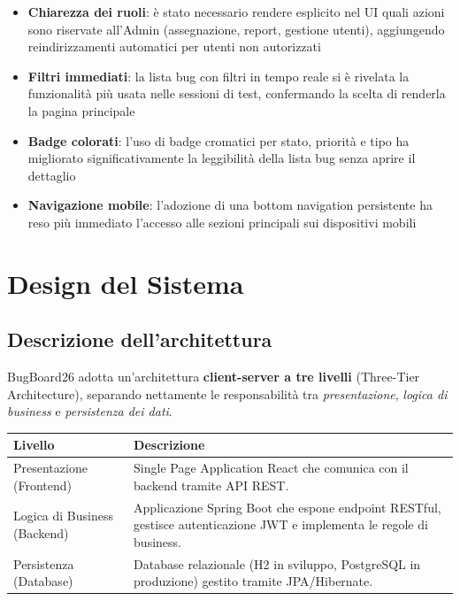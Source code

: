 ﻿\documentclass[a4paper,11pt]{article}
\begin{document}
\begin{itemize}
  \item \textbf{Chiarezza dei ruoli}: \`e stato necessario rendere esplicito nel UI quali azioni sono riservate all'Admin (assegnazione, report, gestione utenti), aggiungendo reindirizzamenti automatici per utenti non autorizzati
  \item \textbf{Filtri immediati}: la lista bug con filtri in tempo reale si \`e rivelata la funzionalit\`a pi\`u usata nelle sessioni di test, confermando la scelta di renderla la pagina principale
  \item \textbf{Badge colorati}: l'uso di badge cromatici per stato, priorit\`a e tipo ha migliorato significativamente la leggibilit\`a della lista bug senza aprire il dettaglio
  \item \textbf{Navigazione mobile}: l'adozione di una bottom navigation persistente ha reso pi\`u immediato l'accesso alle sezioni principali sui dispositivi mobili
\end{itemize}

\section{Design del Sistema}

\subsection{Descrizione dell'architettura}

BugBoard26 adotta un'architettura \textbf{client-server a tre livelli} (Three-Tier Architecture), separando nettamente le responsabilit\`a tra \emph{presentazione}, \emph{logica di business} e \emph{persistenza dei dati}.

\begin{tabular}{|l|p{10cm}|}
\hline
\textbf{Livello} & \textbf{Descrizione} \\
\hline
Presentazione (Frontend) & Single Page Application React che comunica con il backend tramite API REST. \\
\hline
Logica di Business (Backend) & Applicazione Spring Boot che espone endpoint RESTful, gestisce autenticazione JWT e implementa le regole di business. \\
\hline
Persistenza (Database) & Database relazionale (H2 in sviluppo, PostgreSQL in produzione) gestito tramite JPA/Hibernate. \\
\hline
\end{tabular}
\end{document}
